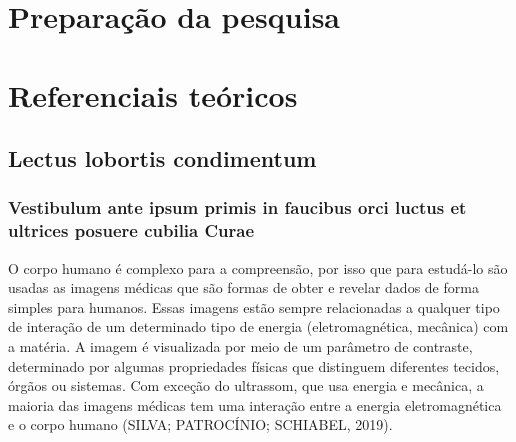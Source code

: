 \documentclass[
	12pt,				%
	openright,			%
	twoside,			%
	a4paper,			%
	english,			%
	french,				%
	spanish,			%
	brazil				%
	]{abntex2}
\begin{document}

\part{Preparação da pesquisa}



\part{Referenciais teóricos}

\chapter{Lectus lobortis condimentum}

\section{Vestibulum ante ipsum primis in faucibus orci luctus et ultrices
posuere cubilia Curae}

O corpo humano é complexo para a compreensão, por isso que para estudá-lo são usadas as imagens médicas que são formas de obter e revelar dados de forma simples para humanos. Essas imagens estão sempre relacionadas a qualquer tipo de interação de um determinado tipo de energia (eletromagnética, mecânica) com a matéria. A imagem é visualizada por meio de um parâmetro de contraste, determinado por algumas propriedades físicas que distinguem diferentes tecidos, órgãos ou sistemas. Com exceção do ultrassom, que usa energia e mecânica, a maioria das imagens médicas tem uma interação entre a energia eletromagnética e o corpo humano (SILVA; PATROCÍNIO; SCHIABEL, 2019).
\end{document}

